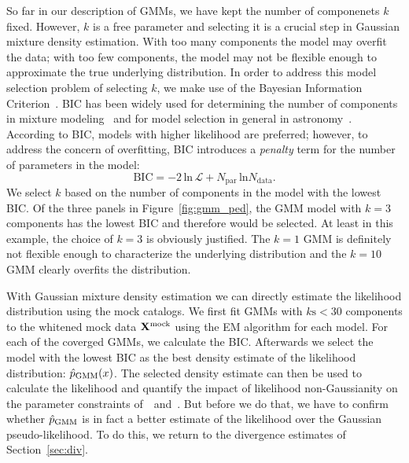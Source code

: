 \documentclass[12pt, letterpaper, preprint]{aastex}
\newcommand{\beq}{\begin{equation}}
\newcommand{\eeq}{\end{equation}}
\newcommand{\Xmock}{{\bf X}^\mathrm{mock}}
\newcommand{\Beut}{\citetalias{beutler2017}}
\newcommand{\Sinh}{\citetalias{sinha2017a}}
\begin{document}
So far in our description of GMMs, we have kept
the number of componenets $k$ fixed. However, $k$ is a free 
parameter and selecting it is a crucial step in Gaussian mixture
density estimation. With too many components the model may overfit 
the data; with too few components, 
the model may not be flexible enough to approximate the true 
underlying distribution. In order to address this model selection problem
of selecting $k$, we make use of the Bayesian Information 
Criterion~\citep[BIC;][]{schwarz1978}. BIC has been widely used for 
determining the number of components in mixture 
modeling~\citep[\emph{e.g.}][]{leroux1992,roeder1997,fraley1998,steele2010performance}
and for model selection in general in 
astronomy~\citep[\emph{e.g.}][]{liddle2007,broderick2011,wilkinson2015,vakili2016}.
According to BIC, models with higher likelihood are preferred; however, 
to address the concern of overfitting, BIC introduces a \emph{penalty} term 
for the number of parameters in the model: 
\beq \label{eq:bic}
\mathrm{BIC} = -2\,\mathrm{ln}\,\mathcal{L} + N_\mathrm{par}\,\mathrm{ln}N_\mathrm{data}.
\eeq
We select $k$ based on the number of components in the model with the 
lowest BIC. Of the three panels in Figure~\ref{fig:gmm_ped}, the GMM 
model with $k=3$ components has the lowest BIC and therefore would be 
selected. At least in this example, the choice of $k=3$ is 
obviously justified. The $k = 1$ GMM is definitely not flexible enough 
to characterize the underlying distribution and the $k=10$ GMM clearly
overfits the distribution. 

With Gaussian mixture density estimation we can directly estimate 
the likelihood distribution using the mock catalogs. We first fit 
GMMs with $k\mathrm{s} < 30$ components to the whitened 
mock data $\Xmock$ using the EM algorithm for each model. For each of the 
coverged GMMs, we calculate the BIC. Afterwards we select 
the model with the lowest BIC as the best density estimate of the likelihood 
distribution: $\hat{p}_\mathrm{\tiny GMM}(x)$. The selected density estimate can 
then be used to calculate the
likelihood and quantify the impact of likelihood non-Gaussianity on the 
parameter constraints of~\Beut~and~\Sinh. But before we do that, we have to 
confirm whether $\hat{p}_\mathrm{\tiny GMM}$ is in fact a better estimate 
of the likelihood over the Gaussian pseudo-likelihood. To do this, we return 
to the divergence estimates of Section~\ref{sec:div}. 
\end{document}
